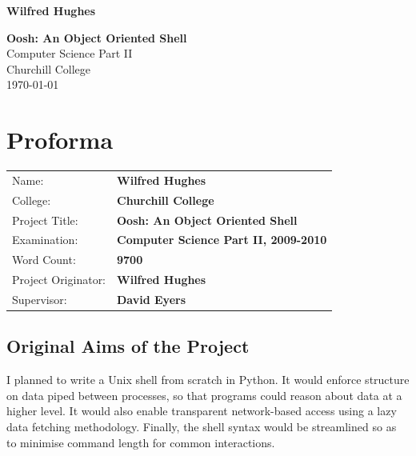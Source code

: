 \documentclass[12pt,twoside,notitlepage]{report}
\begin{document}





\pagestyle{empty}

\hfill{\LARGE \bf Wilfred Hughes}

\vspace*{60mm}
\begin{center}
\Huge
{\bf Oosh: An Object Oriented Shell} \\
\vspace*{5mm}
Computer Science Part II \\
\vspace*{5mm}
Churchill College \\
\vspace*{5mm}
\today  %
\end{center}

\cleardoublepage


\setcounter{page}{1}
\pagestyle{plain}

\chapter*{Proforma}

{\large
\begin{tabular}{ll}
Name:               & \bf Wilfred Hughes                       \\
College:            & \bf Churchill College                     \\
Project Title:      & \bf Oosh: An Object Oriented Shell \\
Examination:        & \bf Computer Science Part II, 2009-2010        \\
Word Count:         & \bf 9700 \\
Project Originator: & \bf Wilfred Hughes                    \\
Supervisor:         & \bf David Eyers                    \\ 
\end{tabular}
}

\section*{Original Aims of the Project}

I planned to write a Unix shell from scratch in Python. It would
enforce structure on data piped between processes, so that programs
could reason about data at a higher level. It would also enable
transparent network-based access using a lazy data fetching
methodology. Finally, the shell syntax would be streamlined so as to
minimise command length for common interactions.
\end{document}

